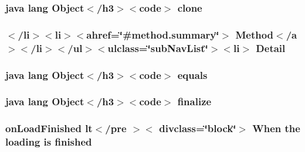 \hypertarget{_login_activity_8html_adc9607fcabf6f2d7f401ad52015ef6e0}{
\subsubsection[{clone}]{\setlength{\rightskip}{0pt plus 5cm}java lang Object$<$/h3$>$$<$code$>$ clone}}\label{_login_activity_8html_adc9607fcabf6f2d7f401ad52015ef6e0}
\hypertarget{_login_activity_8html_a1e04b5ec07bcd5281e26dcd40e5b3a94}{
\subsubsection[{Detail}]{\setlength{\rightskip}{0pt plus 5cm}$<$/li$>$$<$li$>$$<$ahref=\char`\"{}\#method.\-summary\char`\"{}$>$ Method$<$/{\bf a}$>$$<$/li$>$$<$/ul$>$$<$ulclass=\char`\"{}sub\-Nav\-List\char`\"{}$>$$<$li$>$ Detail}}\label{_login_activity_8html_a1e04b5ec07bcd5281e26dcd40e5b3a94}
\hypertarget{_login_activity_8html_a8974318cea585f72df717e0380ec7104}{
\subsubsection[{equals}]{\setlength{\rightskip}{0pt plus 5cm}java lang Object$<$/h3$>$$<$code$>$ equals}}\label{_login_activity_8html_a8974318cea585f72df717e0380ec7104}
\hypertarget{_login_activity_8html_ab2315181ead4aeedef2374039b6ddde7}{
\subsubsection[{finalize}]{\setlength{\rightskip}{0pt plus 5cm}java lang Object$<$/h3$>$$<$code$>$ finalize}}\label{_login_activity_8html_ab2315181ead4aeedef2374039b6ddde7}
\hypertarget{_login_activity_8html_a8c2a5b4f8660d96f558cb54a652c3e2a}{
\subsubsection[{finished}]{\setlength{\rightskip}{0pt plus 5cm}on\-Load\-Finished {\bf lt}$<$/pre $>$$<$ divclass=\char`\"{}block\char`\"{}$>$ When the loading is finished}}\label{_login_activity_8html_a8c2a5b4f8660d96f558cb54a652c3e2a}
